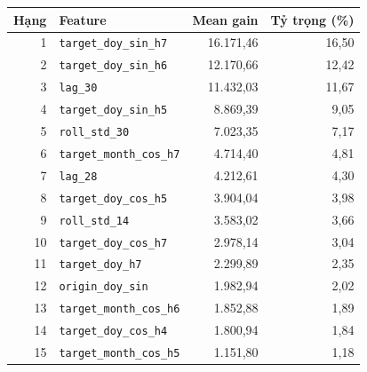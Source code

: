 \begin{tabular}{rlrr}
\toprule
Hạng & Feature & Mean gain & Tỷ trọng (\%) \\
\midrule
1 & \texttt{target\_doy\_sin\_h7} & 16.171{,}46 & 16{,}50 \\
2 & \texttt{target\_doy\_sin\_h6} & 12.170{,}66 & 12{,}42 \\
3 & \texttt{lag\_30} & 11.432{,}03 & 11{,}67 \\
4 & \texttt{target\_doy\_sin\_h5} & 8.869{,}39 & 9{,}05 \\
5 & \texttt{roll\_std\_30} & 7.023{,}35 & 7{,}17 \\
6 & \texttt{target\_month\_cos\_h7} & 4.714{,}40 & 4{,}81 \\
7 & \texttt{lag\_28} & 4.212{,}61 & 4{,}30 \\
8 & \texttt{target\_doy\_cos\_h5} & 3.904{,}04 & 3{,}98 \\
9 & \texttt{roll\_std\_14} & 3.583{,}02 & 3{,}66 \\
10 & \texttt{target\_doy\_cos\_h7} & 2.978{,}14 & 3{,}04 \\
11 & \texttt{target\_doy\_h7} & 2.299{,}89 & 2{,}35 \\
12 & \texttt{origin\_doy\_sin} & 1.982{,}94 & 2{,}02 \\
13 & \texttt{target\_month\_cos\_h6} & 1.852{,}88 & 1{,}89 \\
14 & \texttt{target\_doy\_cos\_h4} & 1.800{,}94 & 1{,}84 \\
15 & \texttt{target\_month\_cos\_h5} & 1.151{,}80 & 1{,}18 \\
\bottomrule
\end{tabular}

